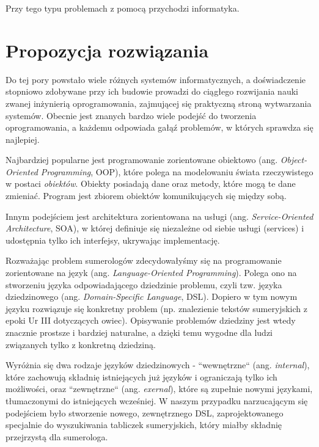 Przy tego typu problemach z pomocą przychodzi informatyka. 

\section*{Propozycja rozwiązania}
Do tej pory powstało wiele różnych systemów informatycznych, a doświadczenie stopniowo zdobywane przy ich budowie prowadzi do ciągłego rozwijania nauki zwanej inżynierią oprogramowania, zajmującej się praktyczną stroną wytwarzania systemów. Obecnie jest znanych bardzo wiele podejść do tworzenia oprogramowania, a każdemu odpowiada gałąź problemów, w których sprawdza się najlepiej. 

Najbardziej popularne jest programowanie zorientowane obiektowo (ang. \emph{Object-Oriented Programming}, OOP), które polega na modelowaniu świata rzeczywistego w postaci \textit{obiektów}. Obiekty posiadają dane oraz metody, które mogą te dane zmieniać. Program jest zbiorem obiektów komunikujących się między sobą. 

Innym podejściem jest architektura zorientowana na usługi (ang. \emph{Service-Oriented Architecture}, SOA), w której definiuje się niezależne od siebie usługi (services) i udostępnia tylko ich interfejsy, ukrywając implementację.

Rozważając problem sumerologów zdecydowałyśmy się na programowanie zorientowane na język (ang. \emph{Language-Oriented Programming}). Polega ono na stworzeniu języka odpowiadającego dziedzinie problemu, czyli tzw. języka dziedzinowego (ang. \emph{Domain-Specific Language}, DSL). Dopiero w tym nowym języku rozwiązuje się konkretny problem (np. znalezienie tekstów sumeryjskich z epoki Ur III dotyczących owiec). Opisywanie problemów dziedziny jest wtedy znacznie prostsze i bardziej naturalne, a dzięki temu wygodne dla ludzi związanych tylko z konkretną dziedziną. 

Wyróżnia się dwa rodzaje języków dziedzinowych - ``wewnętrzne`` (ang. \emph{internal}), które zachowują składnię istniejących już języków i ograniczają tylko ich możliwości, oraz ``zewnętrzne`` (ang. \emph{exernal}), które są zupełnie nowymi językami, tłumaczonymi do istniejących wcześniej. W naszym przypadku narzucającym się podejściem było stworzenie nowego, zewnętrznego DSL, zaprojektowanego specjalnie do wyszukiwania tabliczek sumeryjskich, który miałby składnię przejrzystą dla sumerologa. 


